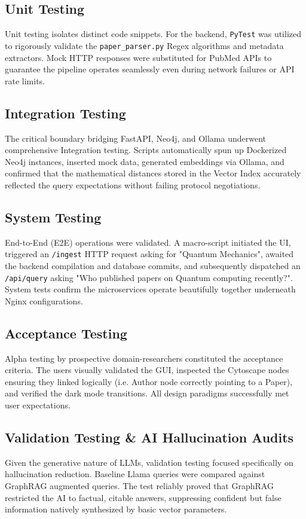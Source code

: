 \documentclass[12pt,a4paper]{report}
\begin{document}
\subsection{Unit Testing}
Unit testing isolates distinct code snippets. For the backend, \texttt{PyTest} was utilized to rigorously validate the \texttt{paper\_parser.py} Regex algorithms and metadata extractors. Mock HTTP responses were substituted for PubMed APIs to guarantee the pipeline operates seamlessly even during network failures or API rate limits.

\subsection{Integration Testing}
The critical boundary bridging FastAPI, Neo4j, and Ollama underwent comprehensive Integration testing. Scripts automatically spun up Dockerized Neo4j instances, inserted mock data, generated embeddings via Ollama, and confirmed that the mathematical distances stored in the Vector Index accurately reflected the query expectations without failing protocol negotiations.

\subsection{System Testing}
End-to-End (E2E) operations were validated. A macro-script initiated the UI, triggered an \texttt{/ingest} HTTP request asking for "Quantum Mechanics", awaited the backend compilation and database commits, and subsequently dispatched an \texttt{/api/query} asking "Who published papers on Quantum computing recently?". System tests confirm the microservices operate beautifully together underneath Nginx configurations.

\subsection{Acceptance Testing}
Alpha testing by prospective domain-researchers constituted the acceptance criteria. The users visually validated the GUI, inspected the Cytoscape nodes ensuring they linked logically (i.e. Author node correctly pointing to a Paper), and verified the dark mode transitions. All design paradigms successfully met user expectations.

\subsection{Validation Testing \& AI Hallucination Audits}
Given the generative nature of LLMs, validation testing focused specifically on hallucination reduction. Baseline Llama queries were compared against GraphRAG augmented queries. The test reliably proved that GraphRAG restricted the AI to factual, citable answers, suppressing confident but false information natively synthesized by basic vector parameters.
\end{document}
